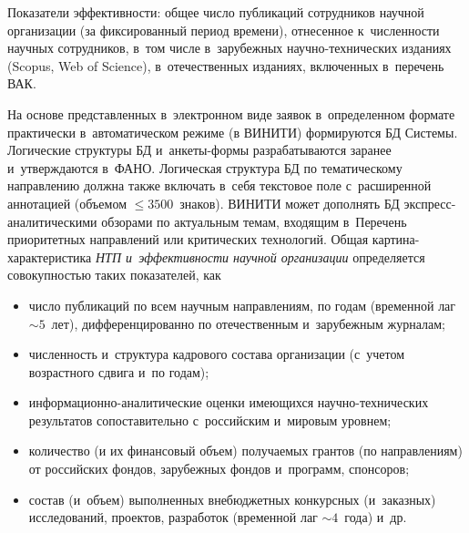 \begin{multicols}{2}
Показатели эффективности: общее число пуб\-ли\-ка\-ций 
сотрудников научной организации (за фиксированный период времени), 
отнесенное к~чис\-лен\-ности научных сотрудников, в~том числе в~зарубежных 
на\-уч\-но-тех\-ни\-че\-ских изданиях (Scopus, Web of Science), в~отечественных изданиях, 
включенных в~перечень ВАК. 
    
    На основе представленных в~электронном виде заявок в~определенном 
формате практически в~автоматическом режиме (в ВИНИТИ) формируются 
БД Сис\-те\-мы. Логические структуры БД и~ан\-ке\-ты-фор\-мы 
разрабатываются заранее и~утверждаются в~ФАНО. Логическая структура БД 
по тематическому на\-прав\-ле\-нию должна также включать в~себя текстовое поле 
с~расширенной аннотацией (объемом $\leq 3500$~знаков). ВИНИТИ может 
дополнять БД экс\-пресс-ана\-ли\-ти\-че\-ски\-ми обзорами по актуальным 
темам, входящим в~Перечень приоритетных направлений или критических 
технологий. Общая кар\-ти\-на-ха\-рак\-те\-ри\-сти\-ка  
\textit{НТП и~эффективности научной 
организации} определяется со\-во\-куп\-ностью таких показателей, как 
    \begin{itemize}
\item число публикаций по всем научным на\-прав\-ле\-ни\-ям, по годам (временной 
лаг $\sim5$~лет), дифференцированно по отечественным и~зарубежным 
журналам;
\item численность и~структура кадрового состава организации (с~учетом 
возрастного сдвига и~по годам);
\item информационно-ана\-ли\-ти\-че\-ские оценки име\-ющих\-ся  
на\-уч\-но-тех\-ни\-че\-ских результатов сопоставительно с~российским 
и~мировым уровнем;
\item количество (и их финансовый объем) по\-лу\-ча\-емых грантов (по 
на\-прав\-ле\-ни\-ям) от российских фондов, зарубежных фондов и~программ, 
спонсоров;
\item состав (и~объем) выполненных внебюджетных конкурсных (и~заказных) 
исследований, проектов, разработок (временной лаг $\sim4$~года) и~др. 
    \end{itemize}
    

\end{multicols}
